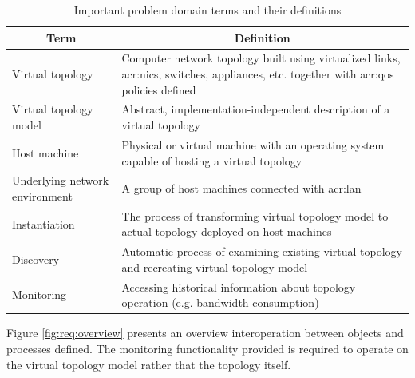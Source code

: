 \documentclass[11pt,openany]{book}
\begin{document}
      \begin{table}[H]
        \centering

        \begin{tabularx}{\textwidth}{|l|X|}

          \hline
          \multicolumn{1}{|c|}{Term}     & \multicolumn{1}{c|}{Definition}                                            \\
          \hline \hline
          Virtual topology               & Computer network topology built using virtualized links, \gls{acr:nic}s,
                                           switches, appliances, etc. together with \gls{acr:qos} policies defined    \\
          \hline
          Virtual topology model         & Abstract, implementation-independent description of a virtual topology     \\
          \hline
          Host machine                   & Physical or virtual machine with an operating system capable of hosting
                                           a virtual topology                                                         \\
          \hline
          Underlying network environment & A group of host machines connected with \gls{acr:lan}                      \\
          \hline
          Instantiation                  & The process of transforming virtual topology model to actual topology
                                           deployed on host machines                                                  \\
          \hline
          Discovery                      & Automatic process of examining existing virtual topology and recreating
                                           virtual topology model                                                     \\
          \hline
          Monitoring                     & Accessing historical information about topology operation (e.g. bandwidth
                                           consumption)                                                               \\
          \hline
        \end{tabularx}
        
        \caption{Important problem domain terms and their definitions}
        \label{tab:req:def}
      \end{table}

      Figure \ref{fig:req:overview} presents an overview interoperation between objects and processes defined. The
      monitoring functionality provided is required to operate on the virtual topology model rather that the topology
      itself.
\end{document}
